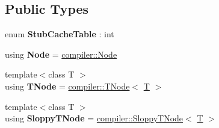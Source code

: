 \subsection*{Public Types}
\begin{DoxyCompactItemize}
\item 
\mbox{\label{classv8_1_1internal_1_1AccessorAssembler_ac424f579d5482775e34a7ddb7c50641f}} 
enum {\bfseries Stub\+Cache\+Table} \+: int 
\item 
\mbox{\label{classv8_1_1internal_1_1AccessorAssembler_ad3fc3d320cbbc52ce39d758183838b26}} 
using {\bfseries Node} = \mbox{\hyperlink{classv8_1_1internal_1_1compiler_1_1Node}{compiler\+::\+Node}}
\item 
\mbox{\label{classv8_1_1internal_1_1AccessorAssembler_aac23b1df29152a80a7e6b838febf443e}} 
{\footnotesize template$<$class T $>$ }\\using {\bfseries T\+Node} = \mbox{\hyperlink{classv8_1_1internal_1_1compiler_1_1TNode}{compiler\+::\+T\+Node}}$<$ \mbox{\hyperlink{classv8_1_1internal_1_1torque_1_1T}{T}} $>$
\item 
\mbox{\label{classv8_1_1internal_1_1AccessorAssembler_aad36dbab416fd1efaee088043f54fef7}} 
{\footnotesize template$<$class T $>$ }\\using {\bfseries Sloppy\+T\+Node} = \mbox{\hyperlink{classv8_1_1internal_1_1compiler_1_1SloppyTNode}{compiler\+::\+Sloppy\+T\+Node}}$<$ \mbox{\hyperlink{classv8_1_1internal_1_1torque_1_1T}{T}} $>$
\end{DoxyCompactItemize}
